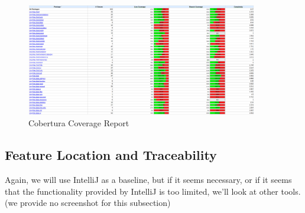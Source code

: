\documentclass{article}
\begin{document}
\begin{figure}[H]
\centering
	\includegraphics[width=0.9\textwidth]{cobertura_coverage.png}
	\caption{Cobertura Coverage Report}
\end{figure}

\subsection{Feature Location and Traceability}

Again, we will use IntelliJ as a baseline, but if it seems necessary, or if it seems that the functionality provided by IntelliJ is too limited, we'll look at other tools.\\

\noindent
(we provide no screenshot for this subsection)
\end{document}
